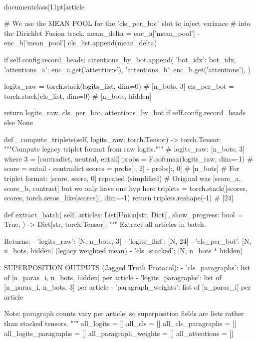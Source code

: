 \\documentclass[11pt]{article}
\begin{document}
\begin{CodeBlock}
            # We use the MEAN POOL for the 'cls_per_bot' slot to inject variance
            # into the Dirichlet Fusion track.
            mean_delta = enc_a['mean_pool'] - enc_b['mean_pool']
            cls_list.append(mean_delta)
            
            if self.config.record_heads:
                attentions_by_bot.append({
                    'bot_idx': bot_idx,
                    'attentions_a': enc_a.get('attentions'),
                    'attentions_b': enc_b.get('attentions'),
                })
        
        logits_raw = torch.stack(logits_list, dim=0)  # [n_bots, 3]
        cls_per_bot = torch.stack(cls_list, dim=0)    # [n_bots, hidden]
        
        return logits_raw, cls_per_bot, attentions_by_bot if self.config.record_heads else None
    
    def _compute_triplets(self, logits_raw: torch.Tensor) -> torch.Tensor:
        """Compute legacy triplet format from raw logits."""
        # logits_raw: [n_bots, 3] where 3 = [contradict, neutral, entail]
        probs = F.softmax(logits_raw, dim=-1)
        # score = entail - contradict
        scores = probs[:, 2] - probs[:, 0]  # [n_bots]
        # For triplet format: [score, score, 0] repeated (simplified)
        # Original was [score_a, score_b, contrast] but we only have one hyp here
        triplets = torch.stack([scores, scores, torch.zeros_like(scores)], dim=-1)
        return triplets.reshape(-1)  # [24]
    
    def extract_batch(
        self,
        articles: List[Union[str, Dict]],
        show_progress: bool = True,
    ) -> Dict[str, torch.Tensor]:
        """
        Extract all articles in batch.

        Returns:
        - 'logits_raw': [N, n_bots, 3]
        - 'logits_flat': [N, 24]
        - 'cls_per_bot': [N, n_bots, hidden] (legacy weighted mean)
        - 'cls_stacked': [N, n_bots * hidden]

        SUPERPOSITION OUTPUTS (Jagged Truth Protocol):
        - 'cls_paragraphs': list of [n_paras_i, n_bots, hidden] per article
        - 'logits_paragraphs': list of [n_paras_i, n_bots, 3] per article
        - 'paragraph_weights': list of [n_paras_i] per article

        Note: paragraph counts vary per article, so superposition fields
        are lists rather than stacked tensors.
        """
        all_logits = []
        all_cls = []
        all_cls_paragraphs = []
        all_logits_paragraphs = []
        all_paragraph_weights = []
        all_attentions = []


\end{CodeBlock}
\end{document}
